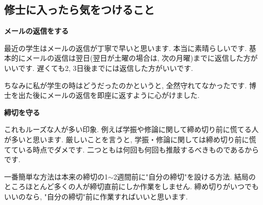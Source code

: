 \subsection{修士に入ったら気をつけること}

\textbf{メールの返信をする}  　\vspace{-6pt} 

最近の学生はメールの返信が丁寧で早いと思います. 本当に素晴らしいです. 
基本的にメールの返信は翌日(翌日が土曜の場合は, 次の月曜)までに返信した方がいいです. 遅くても2, 3日後までには返信した方がいいです. 

ちなみに私が学生の時はどうだったのかというと, 全然守れてなかったです. 博士を出た後にメールの返信を即座に返すように心がけました. 

\vspace{8pt} 

\textbf{締切を守る}  　\vspace{-6pt} 

これもルーズな人が多い印象. 例えば学振や修論に関して締め切り前に慌てる人が多いと思います. 
厳しいことを言うと, 学振・修論に関しては締め切り前に慌てている時点でダメです. 
二つともは何回も何回も推敲するべきものであるからです.  

一番簡単な方法は本来の締切の1$\sim$2週間前に"自分の締切"を設ける方法. 
結局のところほとんど多くの人が締切直前にしか作業をしません. 締め切りがいつでもいいのなら, "自分の締切"前に作業すればいいと思います. 

\vspace{8pt} 

